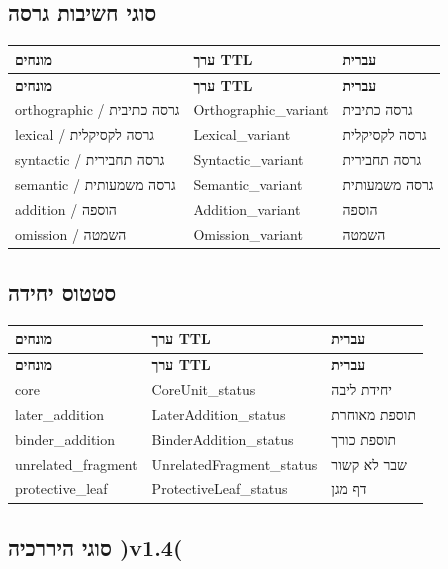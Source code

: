 \documentclass[12pt,a4paper]{article}
\begin{document}
\subsection{סוגי חשיבות גרסה}

\begin{longtable}{|p{4cm}|L{5cm}|L{7cm}|}
\hline
\textbf{מונחים} & \textbf{ערך TTL} & \textbf{עברית} \\
\hline
\endfirsthead
\hline
\textbf{מונחים} & \textbf{ערך TTL} & \textbf{עברית} \\
\hline
\endhead
\hline
\endfoot
orthographic / גרסה כתיבית & Orthographic\_variant & גרסה כתיבית \\
\hline
lexical / גרסה לקסיקלית & Lexical\_variant & גרסה לקסיקלית \\
\hline
syntactic / גרסה תחבירית & Syntactic\_variant & גרסה תחבירית \\
\hline
semantic / גרסה משמעותית & Semantic\_variant & גרסה משמעותית \\
\hline
addition / הוספה & Addition\_variant & הוספה \\
\hline
omission / השמטה & Omission\_variant & השמטה \\
\hline
\end{longtable}

\subsection{סטטוס יחידה}

\begin{longtable}{|p{4cm}|L{5cm}|L{7cm}|}
\hline
\textbf{מונחים} & \textbf{ערך TTL} & \textbf{עברית} \\
\hline
\endfirsthead
\hline
\textbf{מונחים} & \textbf{ערך TTL} & \textbf{עברית} \\
\hline
\endhead
\hline
\endfoot
core & CoreUnit\_status & יחידת ליבה \\
\hline
later\_addition & LaterAddition\_status & תוספת מאוחרת \\
\hline
binder\_addition & BinderAddition\_status & תוספת כורך \\
\hline
unrelated\_fragment & UnrelatedFragment\_status & שבר לא קשור \\
\hline
protective\_leaf & ProtectiveLeaf\_status & דף מגן \\
\hline
\end{longtable}

\subsection{סוגי היררכיה )v1.4(}
\end{document}
